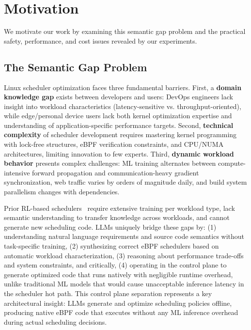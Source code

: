 \section{Motivation}
\label{sec:motivation}

We motivate our work by examining this semantic gap problem and the practical safety, performance, and cost issues revealed by our experiments.

\subsection{The Semantic Gap Problem}

Linux scheduler optimization faces three fundamental barriers. First, a \textbf{domain knowledge gap} exists between developers and users: DevOps engineers lack insight into workload characteristics (latency-sensitive vs. throughput-oriented), while edge/personal device users lack both kernel optimization expertise and understanding of application-specific performance targets. Second, \textbf{technical complexity} of scheduler development requires mastering kernel programming with lock-free structures, eBPF verification constraints, and CPU/NUMA architectures, limiting innovation to few experts. Third, \textbf{dynamic workload behavior} presents complex challenges: ML training alternates between compute-intensive forward propagation and communication-heavy gradient synchronization, web traffic varies by orders of magnitude daily, and build system parallelism changes with dependencies.

Prior RL-based schedulers~\cite{mao2019decima,qiu2020firm,zhang2024mrsch,mao2019park} require extensive training per workload type, lack semantic understanding to transfer knowledge across workloads, and cannot generate new scheduling code. LLMs uniquely bridge these gaps by: (1) understanding natural language requirements and source code semantics without task-specific training, (2) synthesizing correct eBPF schedulers based on automatic workload characterization, (3) reasoning about performance trade-offs and system constraints, and critically, (4) operating in the control plane to generate optimized code that runs natively with negligible runtime overhead, unlike traditional ML models that would cause unacceptable inference latency in the scheduler hot path. This control plane separation represents a key architectural insight: LLMs generate and optimize scheduling policies offline, producing native eBPF code that executes without any ML inference overhead during actual scheduling decisions.

